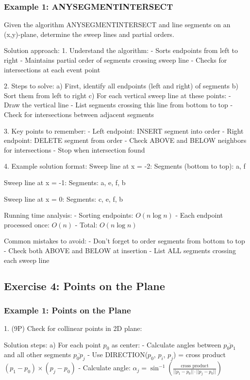 \subsubsection{Example 1: ANYSEGMENTINTERSECT}

Given the algorithm ANYSEGMENTINTERSECT and line segments on an (x,y)-plane, determine the sweep lines and partial orders.

Solution approach:
1. Understand the algorithm:
   - Sorts endpoints from left to right
   - Maintains partial order of segments crossing sweep line
   - Checks for intersections at each event point

2. Steps to solve:
   a) First, identify all endpoints (left and right) of segments
   b) Sort them from left to right
   c) For each vertical sweep line at these points:
      - Draw the vertical line
      - List segments crossing this line from bottom to top
      - Check for intersections between adjacent segments

3. Key points to remember:
   - Left endpoint: INSERT segment into order
   - Right endpoint: DELETE segment from order
   - Check ABOVE and BELOW neighbors for intersections
   - Stop when intersection found

4. Example solution format:
   Sweep line at x = -2:
   Segments (bottom to top): a, f
   
   Sweep line at x = -1:
   Segments: a, e, f, b
   
   Sweep line at x = 0:
   Segments: c, e, f, b

Running time analysis:
- Sorting endpoints: $O(n \log n)$
- Each endpoint processed once: $O(n)$
- Total: $O(n \log n)$

Common mistakes to avoid:
- Don't forget to order segments from bottom to top
- Check both ABOVE and BELOW at insertion
- List ALL segments crossing each sweep line

\subsection{Exercise 4: Points on the Plane}

\subsubsection{Example 1: Points on the Plane}

1. (9P) Check for collinear points in 2D plane:

Solution steps:
a) For each point $p_0$ as center:
   - Calculate angles between $\overline{p_0p_1}$ and all other segments $\overline{p_0p_j}$
   - Use DIRECTION($p_0$, $p_i$, $p_j$) = cross product $(p_1 - p_0) \times (p_j - p_0)$
   - Calculate angle: $\alpha_j = \sin^{-1}\left(\frac{\text{cross product}}{||p_1-p_0|| \cdot ||p_j-p_0||}\right)$

